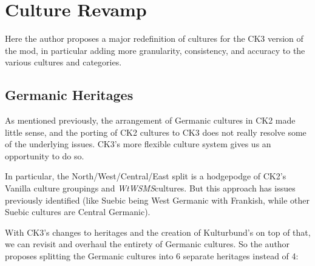 \documentclass{article}
\newcommand{\wtwsms}{\textit{WtWSMS}}
\begin{document}
	\section{Culture Revamp}
	\label{sec:cultureRevamp}
	
	Here the author proposes a major redefinition of cultures for the CK3 version of the mod, in particular adding more granularity, consistency, and accuracy to the various cultures and categories.
	
	\subsection{Germanic Heritages}
	\label{sec:culture_review:subsec:germanic_heritages}
	As mentioned previously, the arrangement of Germanic cultures in CK2 made little sense, and the porting of CK2 cultures to CK3 does not really resolve some of the underlying issues.
	CK3's more flexible culture system gives us an opportunity to do so.
	
	In particular, the North/West/Central/East split is a hodgepodge of CK2's Vanilla culture groupings and \wtwsms cultures.
	But this approach has issues previously identified (like Suebic being West Germanic with Frankish, while other Suebic cultures are Central Germanic).
	
	With CK3's changes to heritages and the creation of Kulturbund's on top of that, we can revisit and overhaul the entirety of Germanic cultures.
	So the author proposes splitting the Germanic cultures into 6 separate heritages instead of 4:
	
\end{document}
